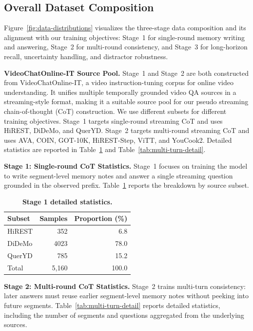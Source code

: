 \documentclass{article}
\begin{document}
\subsection{Overall Dataset Composition}
\label{app:data-composition}

Figure~\ref{fig:data-distributions} visualizes the three-stage data composition and its alignment with our training objectives: Stage~1 for single-round memory writing and answering, Stage~2 for multi-round consistency, and Stage~3 for long-horizon recall, uncertainty handling, and distractor robustness.

\noindent\textbf{VideoChatOnline-IT Source Pool.}
Stage~1 and Stage~2 are both constructed from VideoChatOnline-IT, a video instruction-tuning corpus for online video understanding. It unifies multiple temporally grounded video QA sources in a streaming-style format, making it a suitable source pool for our pseudo streaming chain-of-thought (CoT) construction. We use different subsets for different training objectives. Stage~1 targets single-round streaming CoT and uses HiREST, DiDeMo, and QuerYD. Stage~2 targets multi-round streaming CoT and uses AVA, COIN, GOT-10K, HiREST-Step, ViTT, and YouCook2. Detailed statistics are reported in Table~\ref{tab:single-cot} and Table~\ref{tab:multi-turn-detail}.

\noindent\textbf{Stage 1: Single-round CoT Statistics.}
\label{app:single-cot}
Stage~1 focuses on training the model to write segment-level memory notes and answer a single streaming question grounded in the observed prefix. Table~\ref{tab:single-cot} reports the breakdown by source subset.

\begin{table}[!htbp]
  \caption{\textbf{Stage 1 detailed statistics.}}
  \label{tab:single-cot}
  \centering
  \small
  \begin{tabular}{lrr}
    \toprule
    \textbf{Subset} & \textbf{Samples} & \textbf{Proportion (\%)} \\
    \midrule
    HiREST & 352 & 6.8 \\
    DiDeMo & 4023 & 78.0 \\
    QuerYD & 785 & 15.2 \\
    \midrule
    Total & 5,160 & 100.0 \\
    \bottomrule
  \end{tabular}
\end{table}

\noindent\textbf{Stage 2: Multi-round CoT Statistics.}
\label{app:multi-turn-cot}
Stage~2 trains multi-turn consistency: later answers must reuse earlier segment-level memory notes without peeking into future segments. Table~\ref{tab:multi-turn-detail} reports detailed statistics, including the number of segments and questions aggregated from the underlying sources.
\end{document}
